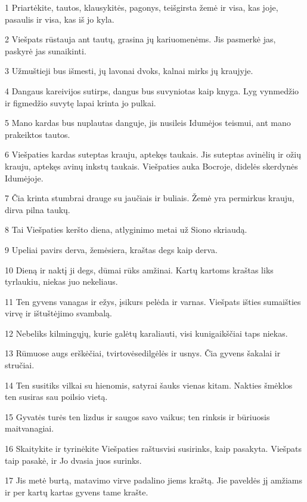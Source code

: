 \par 1 Priartėkite, tautos, klausykitės, pagonys, teišgirsta žemė ir visa, kas joje, pasaulis ir visa, kas iš jo kyla. 
\par 2 Viešpats rūstauja ant tautų, grasina jų kariuomenėms. Jis pasmerkė jas, paskyrė jas sunaikinti. 
\par 3 Užmuštieji bus išmesti, jų lavonai dvoks, kalnai mirks jų kraujyje. 
\par 4 Dangaus kareivijos sutirps, dangus bus suvyniotas kaip knyga. Lyg vynmedžio ir figmedžio suvytę lapai krinta jo pulkai. 
\par 5 Mano kardas bus nuplautas danguje, jis nusileis Idumėjos teismui, ant mano prakeiktos tautos. 
\par 6 Viešpaties kardas suteptas krauju, aptekęs taukais. Jis suteptas avinėlių ir ožių krauju, aptekęs avinų inkstų taukais. Viešpaties auka Bocroje, didelės skerdynės Idumėjoje. 
\par 7 Čia krinta stumbrai drauge su jaučiais ir buliais. Žemė yra permirkus krauju, dirva pilna taukų. 
\par 8 Tai Viešpaties keršto diena, atlyginimo metai už Siono skriaudą. 
\par 9 Upeliai pavirs derva, žemė­siera, kraštas degs kaip derva. 
\par 10 Dieną ir naktį ji degs, dūmai rūks amžinai. Kartų kartoms kraštas liks tyrlaukiu, niekas juo nekeliaus. 
\par 11 Ten gyvens vanagas ir ežys, įsikurs pelėda ir varnas. Viešpats išties sumaišties virvę ir ištuštėjimo svambalą. 
\par 12 Nebeliks kilmingųjų, kurie galėtų karaliauti, visi kunigaikščiai taps niekas. 
\par 13 Rūmuose augs erškėčiai, tvirtovėse­dilgėlės ir usnys. Čia gyvens šakalai ir stručiai. 
\par 14 Ten susitiks vilkai su hienomis, satyrai šauks vienas kitam. Nakties šmėklos ten susiras sau poilsio vietą. 
\par 15 Gyvatės turės ten lizdus ir saugos savo vaikus; ten rinksis ir būriuosis maitvanagiai. 
\par 16 Skaitykite ir tyrinėkite Viešpaties raštus­visi susirinks, kaip pasakyta. Viešpats taip pasakė, ir Jo dvasia juos surinks. 
\par 17 Jis metė burtą, matavimo virve padalino jiems kraštą. Jie paveldės jį amžiams ir per kartų kartas gyvens tame krašte.



